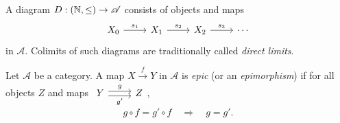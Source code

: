  \begin{example}
   A diagram $D:(\mathbb{N},\le)\to \mathscr{A}$ consists of objects and maps
   \[
   \begin{tikzcd}
     X_0\arrow[r,"s_1"] &X_1\arrow[r,"s_2"] &X_2 \arrow[r,"s_3"] &\cdots 
   \end{tikzcd}
   \] in $\mathscr{A}$. Colimits of such diagrams are traditionally called  \textit{direct limits}.
 \end{example} 

\begin{definition}
  Let $\mathscr{A}$ be a category. A map $X\xrightarrow{f}Y$ in $\mathscr{A}$ is \textit{epic} (or an \textit{epimorphism}) if for all objects $Z$ and maps $
  \begin{tikzcd}
    Y\arrow[r,shift left, "g"] \arrow[r, shift right, "g'"'] &Z
  \end{tikzcd}$,
  \[
  g\circ f=g'\circ f\quad \Longrightarrow \quad g=g'.
  \] 
\end{definition}

